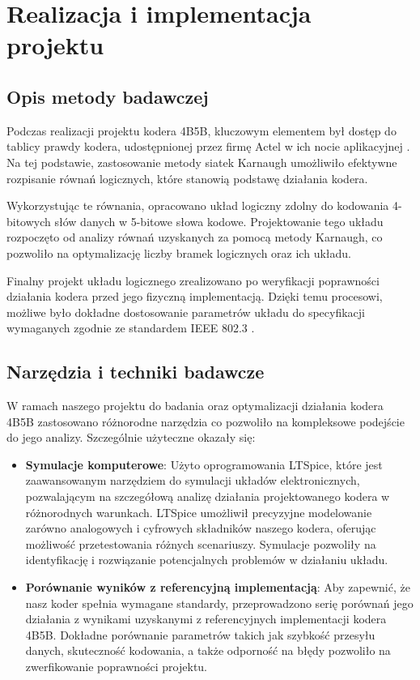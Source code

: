 \documentclass{article}
\begin{document}
\newpage

\section{Realizacja i implementacja projektu}
\subsection{Opis metody badawczej}
Podczas realizacji projektu kodera 4B5B, kluczowym elementem był dostęp do tablicy prawdy kodera, udostępnionej przez firmę Actel w ich nocie aplikacyjnej \cite{actel}. Na tej podstawie, zastosowanie metody siatek Karnaugh umożliwiło efektywne rozpisanie równań logicznych, które stanowią podstawę działania kodera.

Wykorzystując te równania, opracowano układ logiczny zdolny do kodowania 4-bitowych słów danych w 5-bitowe słowa kodowe. Projektowanie tego układu rozpoczęto od analizy równań uzyskanych za pomocą metody Karnaugh, co pozwoliło na optymalizację liczby bramek logicznych oraz ich układu.

Finalny projekt układu logicznego zrealizowano po weryfikacji poprawności działania kodera przed jego fizyczną implementacją. Dzięki temu procesowi, możliwe było dokładne dostosowanie parametrów układu do specyfikacji wymaganych zgodnie ze standardem IEEE 802.3 \cite{ieee802}.

\subsection{Narzędzia i techniki badawcze}
W ramach naszego projektu do badania oraz optymalizacji działania kodera 4B5B zastosowano różnorodne narzędzia co pozwoliło na kompleksowe podejście do jego analizy. Szczególnie użyteczne okazały się:

\begin{itemize}
\item \textbf{Symulacje komputerowe}: Użyto oprogramowania LTSpice, które jest zaawansowanym narzędziem do symulacji układów elektronicznych, pozwalającym na szczegółową analizę działania projektowanego kodera w różnorodnych warunkach. LTSpice umożliwił precyzyjne modelowanie zarówno analogowych i cyfrowych składników naszego kodera, oferując możliwość przetestowania różnych scenariuszy. Symulacje pozwoliły na identyfikację i rozwiązanie potencjalnych problemów w działaniu układu.

\item \textbf{Porównanie wyników z referencyjną implementacją}: Aby zapewnić, że nasz koder spełnia wymagane standardy, przeprowadzono serię porównań jego działania z wynikami uzyskanymi z referencyjnych implementacji kodera 4B5B. Dokładne porównanie parametrów takich jak szybkość przesyłu danych, skuteczność kodowania, a także odporność na błędy pozwoliło na zwerfikowanie poprawności projektu.

\end{itemize}
\end{document}

